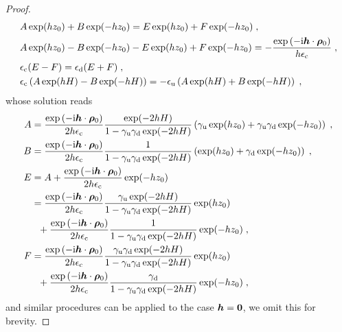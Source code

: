 \begin{proof}
\begin{equation}
\begin{aligned}
 &A\exp(hz_0)+B\exp(-hz_0)  = E\exp(hz_0)+F\exp(-hz_0)\;,\\
 &A\exp(hz_0)-B\exp(-hz_0)-E\exp(hz_0)+F\exp(-hz_0)=-\frac{ \exp{(-\mathrm{i} \boldsymbol{h} \cdot \boldsymbol{\rho}_0)}}{h\epsilon_{\mathrm{c}}}\;,\\
 &\epsilon_{\mathrm{c}}(E-F)=\epsilon_{\mathrm{d}}(E+F)\;,\\
 &\epsilon_{\mathrm{c}}\left(A\exp(hH)-B\exp(-hH)\right)=-\epsilon_{\mathrm{u}}\left(A\exp(hH)+B\exp(-hH)\right)\;,
\end{aligned}\end{equation}
whose solution reads
\begin{align*}
A&=\frac{ \exp{(-\mathrm{i} \boldsymbol{h} \cdot \boldsymbol{\rho}_0)}}{2h\epsilon_{\mathrm{c}}}\frac{\exp(-2hH)}{1-\gamma_{\mathrm{u}}\gamma_{\mathrm{d}}\exp(-2hH)} \left(\gamma_{\mathrm{u}}\exp(hz_0)+\gamma_{\mathrm{u}}\gamma_{\mathrm{d}}\exp(-hz_0)\right)\;,\\
B&=\frac{ \exp{(-\mathrm{i} \boldsymbol{h} \cdot \boldsymbol{\rho}_0)} }{2h\epsilon_{\mathrm{c}}}\frac{1}{1-\gamma_{\mathrm{u}}\gamma_{\mathrm{d}}\exp(-2hH)} \left(\exp(hz_0)+\gamma_{\mathrm{d}}\exp(-hz_0)\right)\;,\\
E&=A+\frac{\exp{(-\mathrm{i} \boldsymbol{h} \cdot \boldsymbol{\rho}_0)} }{2h\epsilon_{\mathrm{c}}}\exp(-hz_0)\\
&=\frac{\exp{(-\mathrm{i} \boldsymbol{h} \cdot \boldsymbol{\rho}_0)}}{2h\epsilon_{\mathrm{c}}}\frac{\gamma_{\mathrm{u}}\exp(-2hH)}{1-\gamma_{\mathrm{u}}\gamma_{\mathrm{d}}\exp(-2hH)} \exp(hz_0)\\&~~+\frac{\exp{(-\mathrm{i} \boldsymbol{h} \cdot \boldsymbol{\rho}_0)}}{2h\epsilon_{\mathrm{c}}}\frac{1}{1-\gamma_{\mathrm{u}}\gamma_{\mathrm{d}}\exp(-2hH)}\exp(-hz_0)\;,\\
F&=\frac{\exp{(-\mathrm{i} \boldsymbol{h} \cdot \boldsymbol{\rho}_0)}}{2h\epsilon_{\mathrm{c}}}\frac{\gamma_{\mathrm{u}}\gamma_{\mathrm{d}}\exp(-2hH)}{1-\gamma_{\mathrm{u}}\gamma_{\mathrm{d}}\exp(-2hH)} \exp(hz_0)\\&~~+\frac{\exp{(-\mathrm{i} \boldsymbol{h} \cdot \boldsymbol{\rho}_0)}}{2h\epsilon_{\mathrm{c}}}\frac{\gamma_{\mathrm{d}}}{1-\gamma_{\mathrm{u}}\gamma_{\mathrm{d}}\exp(-2hH)} \exp(-hz_0)\;,
\end{align*}
 and similar procedures can be applied to the case $\boldsymbol{h}=\bm{0}$, we omit this for brevity.
\end{proof}


